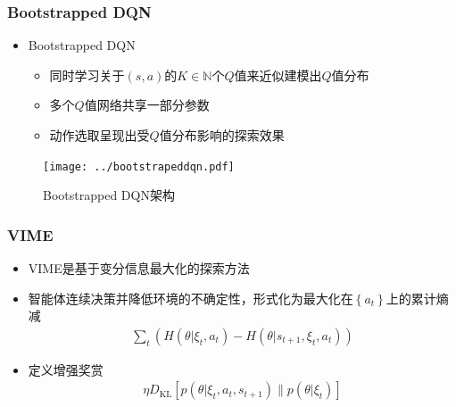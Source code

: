 \documentclass{beamer}
\begin{document}
\begin{CJK*}{GBK}{hei}
\begin{frame}\frametitle{Bootstrapped DQN}
\begin{itemize}
\item Bootstrapped DQN\citep{osband2016deep}
{
\begin{itemize}
\item 同时学习关于$(s,a)$的$K \in \mathbb{N}$个$Q$值来近似建模出$Q$值分布
\item 多个$Q$值网络共享一部分参数
\item 动作选取呈现出受$Q$值分布影响的探索效果
\end{itemize}
}
\end{itemize}
\begin{figure}[htbp]
    \centering\texttt{[image: ../bootstrapeddqn.pdf]}
	\caption{Bootstrapped DQN架构}
\end{figure}
\end{frame}


\begin{frame}\frametitle{VIME}
\begin{itemize}
\item VIME\citep{Houthooft2016VIMEVI}是基于变分信息最大化的探索方法
\item 智能体连续决策并降低环境的不确定性，形式化为最大化在$\left\{a_{t}\right\}$上的累计熵减
\begin{align*}
        \sum_{t}\left(H\left(\theta \vert \xi_{t}, a_{t}\right)-H\left(\theta \vert s_{t+1}, \xi_{t}, a_{t}\right)\right)
\end{align*}
\item 定义增强奖赏
\begin{align*}
    \eta D_{\mathrm{KL}}\left[p\left(\theta \vert \xi_{t}, a_{t}, s_{t+1}\right) \| p\left(\theta \vert \xi_{t}\right)\right]
\end{align*}
\end{itemize}
\end{frame}


\end{CJK*}
\end{document}
